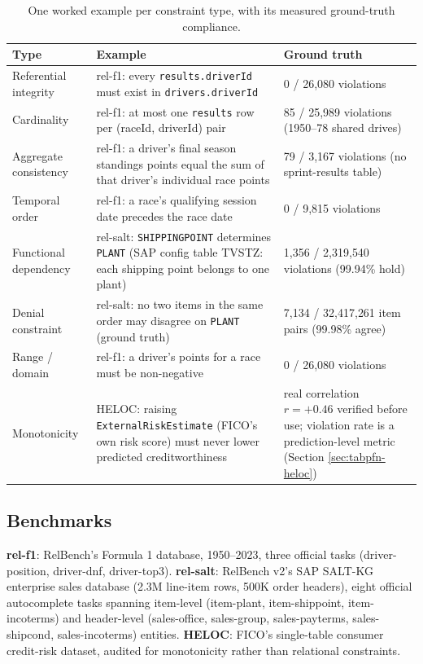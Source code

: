 \documentclass[11pt]{article}
\begin{document}
\begin{table}[h]
\centering
\small
\caption{One worked example per constraint type, with its measured ground-truth compliance.}
\label{tab:examples}
\begin{tabularx}{\linewidth}{@{} l L{4.3cm} X @{}}
\toprule
\textbf{Type} & \textbf{Example} & \textbf{Ground truth} \\
\midrule
Referential integrity & rel-f1: every \texttt{results.driverId} must exist in
  \texttt{drivers.driverId} & 0 / 26{,}080 violations \\[3pt]
Cardinality & rel-f1: at most one \texttt{results} row per (raceId, driverId) pair &
  85 / 25{,}989 violations (1950--78 shared drives) \\[3pt]
Aggregate consistency & rel-f1: a driver's final season standings points equal the sum of
  that driver's individual race points & 79 / 3{,}167 violations (no sprint-results table) \\[3pt]
Temporal order & rel-f1: a race's qualifying session date precedes the race date &
  0 / 9{,}815 violations \\[3pt]
Functional dependency & rel-salt: \texttt{SHIPPINGPOINT} determines \texttt{PLANT} (SAP
  config table TVSTZ: each shipping point belongs to one plant) & 1{,}356 / 2{,}319{,}540
  violations (99.94\% hold) \\[3pt]
Denial constraint & rel-salt: no two items in the same order may disagree on \texttt{PLANT}
  (ground truth) & 7{,}134 / 32{,}417{,}261 item pairs (99.98\% agree) \\[3pt]
Range / domain & rel-f1: a driver's points for a race must be non-negative &
  0 / 26{,}080 violations \\[3pt]
Monotonicity & HELOC: raising \texttt{ExternalRiskEstimate} (FICO's own risk score) must
  never lower predicted creditworthiness & real correlation $r=+0.46$ verified before use;
  violation rate is a prediction-level metric (Section \ref{sec:tabpfn-heloc}) \\
\bottomrule
\end{tabularx}
\end{table}

\subsection{Benchmarks}

\textbf{rel-f1}: RelBench's Formula 1 database, 1950--2023, three official tasks
(driver-position, driver-dnf, driver-top3). \textbf{rel-salt}: RelBench v2's SAP SALT-KG
enterprise sales database (2.3M line-item rows, 500K order headers), eight official
autocomplete tasks spanning item-level (item-plant, item-shippoint, item-incoterms) and
header-level (sales-office, sales-group, sales-payterms, sales-shipcond, sales-incoterms)
entities. \textbf{HELOC}: FICO's single-table consumer credit-risk dataset, audited for
monotonicity rather than relational constraints.
\end{document}
